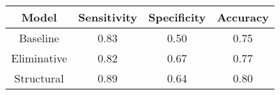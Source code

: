 \begin{table}[ht]
  \centering
  \begin{tabular}[t]{ c | c  c  c }
    \hline
    \textbf{Model} & \textbf{Sensitivity} & \textbf{Specificity} & \textbf{Accuracy} \\
    \hline
    Baseline & 0.83 & 0.50 & 0.75 \\
    Eliminative & 0.82 & 0.67 & 0.77 \\
    Structural & 0.89 & 0.64 & 0.80 \\
    \hline
  \end{tabular}
\end{table}